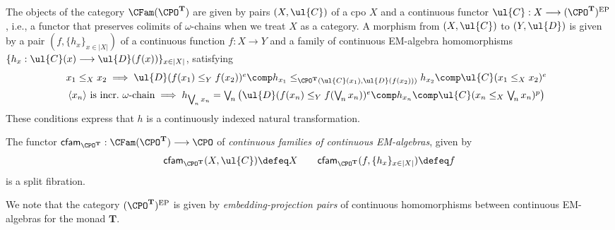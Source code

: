 \begin{definition}
The objects of the category $\CFam(\CPO^{\mathbf{T}})$ are given by pairs $(X,\ul{C})$ of a cpo $X$ and a continuous functor $\ul{C} : X \longrightarrow (\CPO^{\mathbf{T}})^{\text{EP}}$, i.e., a functor that preserves colimits of $\omega$-chains when we treat $X$ as a category. A morphism from $(X,\ul{C})$ to $(Y,\ul{D})$ is given by a pair $(f,\{h_x\}_{x \in \vert X \vert})$ of a continuous function $f : X \longrightarrow Y$ and a family of continuous EM-algebra homomorphisms $\{h_x : \ul{C}(x) \longrightarrow \ul{D}(f(x))\}_{x \in \vert X \vert}$, satisfying
\vspace{-0.15cm}
\[
\hspace{-0.2cm}
\begin{array}{c}
x_1 \leq_X x_2 \implies \ul{D}(f(x_1) \leq_Y f(x_2))^e \comp h_{x_1} \leq _{\CPO^{\mathbf{T}}(\ul{C}(x_1),\ul{D}(f(x_2)))}
h_{x_2} \comp \ul{C}(x_1 \leq_X x_2)^e
\\[2mm]
\langle x_n \rangle \text{~is incr.~} \omega \text{-chain} \implies h_{\bigvee_{\!n} x_n} = \bigvee_{\!n} \big(\ul{D}(f(x_n) \leq_Y f(\bigvee_{\!n} x_n))^e \comp h_{x_n} \comp \ul{C}(x_n \leq_X \bigvee_{\!n} x_n)^p\big)
\end{array}
\vspace{-0.1cm}
\]
These conditions express that $h$ is a continuously indexed natural transformation.
\end{definition}

\begin{proposition}
The functor $\mathsf{cfam}_{\CPO^{\mathbf{T}}} : \CFam(\CPO^{\mathbf{T}}) \longrightarrow \CPO$ of \emph{continuous families of continuous EM-algebras}, given by
\[
\mathsf{cfam}_{\CPO^{\mathbf{T}}}(X,\ul{C}) \defeq X
\qquad
\mathsf{cfam}_{\CPO^{\mathbf{T}}}(f,\{h_x\}_{x \in \vert X \vert}) \defeq f
\]
is a split fibration.
\end{proposition}

We note that the category $(\CPO^{\mathbf{T}})^{\text{EP}}$ is given by \emph{embedding-projection pairs} of continuous homomorphisms between continuous EM-algebras for the monad $\mathbf{T}$. 

